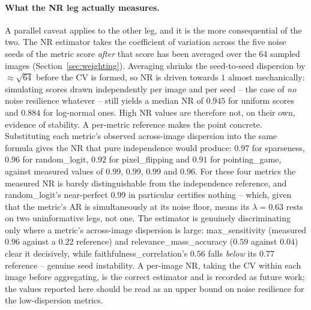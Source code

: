 \paragraph{What the NR leg actually measures.}
A parallel caveat applies to the other leg, and it is the more consequential
of the two. The NR estimator takes the coefficient of variation across the
five noise seeds of the metric score \emph{after} that score has been
averaged over the 64 sampled images (Section~\ref{sec:weighting}). Averaging
shrinks the seed-to-seed dispersion by ${\approx}\sqrt{64}$ before the CV is
formed, so NR is driven towards $1$ almost mechanically: simulating scores
drawn independently per image and per seed -- the case of \emph{no} noise
resilience whatever -- still yields a median $\mathrm{NR}$ of $0.945$ for
uniform scores and $0.884$ for log-normal ones. High NR values are therefore
not, on their own, evidence of stability.
A per-metric reference makes the point concrete. Substituting each metric's
observed across-image dispersion into the same formula gives the NR that
pure independence would produce: $0.97$ for sparseness, $0.96$ for
random\_logit, $0.92$ for pixel\_flipping and $0.91$ for pointing\_game,
against measured values of $0.99$, $0.99$, $0.99$ and $0.96$. For these
four metrics the measured NR is barely distinguishable from the
independence reference, and random\_logit's near-perfect $0.99$ in
particular certifies nothing -- which, given that the metric's AR is
simultaneously at its noise floor, means its $\lambda = 0.63$ rests on two
uninformative legs, not one. The estimator is genuinely discriminating only
where a metric's across-image dispersion is large: max\_sensitivity
(measured $0.96$ against a $0.22$ reference) and
relevance\_mass\_accuracy ($0.59$ against $0.04$) clear it decisively,
while faithfulness\_correlation's $0.56$ falls \emph{below} its $0.77$
reference -- genuine seed instability. A per-image NR, taking the CV within
each image before aggregating, is the correct estimator and is recorded as
future work; the values reported here should be read as an upper bound on
noise resilience for the low-dispersion metrics.

